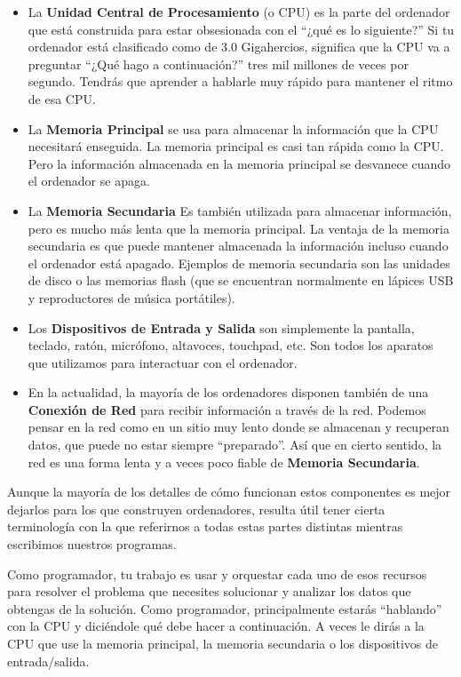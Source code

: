 \begin{itemize}

\item La {\bf Unidad Central de Procesamiento} (o CPU) es
la parte del ordenador que está construida para estar obsesionada
con el ``¿qué es lo siguiente?'' Si tu ordenador está clasificado
como de 3.0 Gigahercios, significa que la CPU va a preguntar ``¿Qué hago a continuación?''
tres mil millones de veces por segundo. Tendrás que aprender a hablarle muy
rápido para mantener el ritmo de esa CPU.

\item La {\bf Memoria Principal} se usa para almacenar la información
que la CPU necesitará enseguida. La memoria principal es casi
tan rápida como la CPU. Pero la información almacenada en la memoria
principal se desvanece cuando el ordenador se apaga.

\item La {\bf Memoria Secundaria} Es también utilizada para almacenar
información, pero es mucho más lenta que la memoria principal.
La ventaja de la memoria secundaria es que puede mantener
almacenada la información incluso cuando el ordenador está apagado.
Ejemplos de memoria secundaria son las unidades de disco o las
memorias flash (que se encuentran normalmente en lápices USB y
reproductores de música portátiles).

\item Los {\bf Dispositivos de Entrada y Salida} son simplemente
la pantalla, teclado, ratón, micrófono, altavoces, touchpad, etc.
Son todos los aparatos que utilizamos para interactuar con el ordenador.

\item En la actualidad, la mayoría de los ordenadores disponen también de una
{\bf Conexión de Red} para recibir información a través de la red.
Podemos pensar en la red como en un sitio muy lento donde se almacenan
y recuperan datos, que puede no estar siempre ``preparado''. Así que en cierto sentido,
la red es una forma lenta y a veces poco fiable de
{\bf Memoria Secundaria}.

\end{itemize}

Aunque la mayoría de los detalles de cómo funcionan estos componentes es mejor
dejarlos para los que construyen ordenadores, resulta útil tener cierta terminología
con la que referirnos a todas estas partes distintas mientras escribimos nuestros programas.

Como programador, tu trabajo es usar y orquestar cada uno de esos
recursos para resolver el problema que necesites solucionar
y analizar los datos que obtengas de la solución. Como programador, principalmente
estarás ``hablando'' con la CPU y diciéndole qué debe hacer a continuación.
A veces le dirás a la CPU que use la memoria principal,
la memoria secundaria o los dispositivos de entrada/salida.

